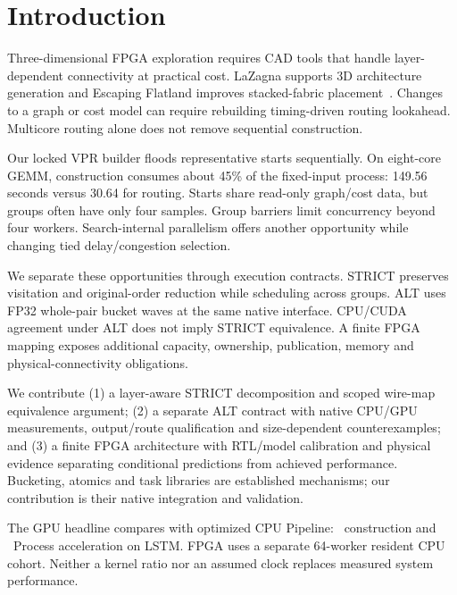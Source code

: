\section{Introduction}
Three-dimensional FPGA exploration requires CAD tools that handle layer-dependent connectivity at practical cost. LaZagna supports 3D architecture generation and Escaping Flatland improves stacked-fabric placement~\cite{lazagna,flatland}. Changes to a graph or cost model can require rebuilding timing-driven routing lookahead. Multicore routing alone does not remove sequential construction.

Our locked VPR builder floods representative starts sequentially. On eight-core GEMM, construction consumes about 45\% of the fixed-input process: 149.56 seconds versus 30.64 for routing. Starts share read-only graph/cost data, but groups often have only four samples. Group barriers limit concurrency beyond four workers. Search-internal parallelism offers another opportunity while changing tied delay/congestion selection.

We separate these opportunities through execution contracts. STRICT preserves visitation and original-order reduction while scheduling across groups. ALT uses FP32 whole-pair bucket waves at the same native interface. CPU/CUDA agreement under ALT does not imply STRICT equivalence. A finite FPGA mapping exposes additional capacity, ownership, publication, memory and physical-connectivity obligations.

We contribute (1) a layer-aware STRICT decomposition and scoped wire-map equivalence argument; (2) a separate ALT contract with native CPU/GPU measurements, output/route qualification and size-dependent counterexamples; and (3) a finite FPGA architecture with RTL/model calibration and physical evidence separating conditional predictions from achieved performance. Bucketing, atomics and task libraries are established mechanisms; our contribution is their native integration and validation.

The GPU headline compares with optimized CPU Pipeline: \LstmPipeBuild\ construction and \LstmPipeProc\ Process acceleration on LSTM. FPGA uses a separate 64-worker resident CPU cohort. Neither a kernel ratio nor an assumed clock replaces measured system performance.

